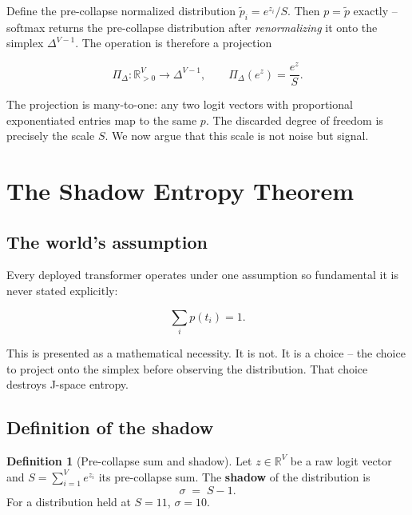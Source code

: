 \documentclass[11pt]{article}
\theoremstyle{definition}
\newtheorem{definition}[theorem]{Definition}
\newcommand{\RR}{\mathbb{R}}
\newcommand{\shadow}{\sigma}
\newcommand{\pth}{\tilde{p}}
\begin{document}
Define the pre-collapse normalized distribution
$\pth_i = e^{z_i} / S$. Then $p = \pth$ exactly -- softmax returns the
pre-collapse distribution after \emph{renormalizing} it onto the simplex
$\Delta^{V-1}$. The operation is therefore a projection

\begin{equation}
  \Pi_{\Delta} : \RR_{>0}^{V} \to \Delta^{V-1}, \qquad
  \Pi_{\Delta}(e^{z}) = \frac{e^{z}}{S}.
\end{equation}

The projection is many-to-one: any two logit vectors with proportional
exponentiated entries map to the same $p$. The discarded degree of freedom is
precisely the scale $S$. We now argue that this scale is not noise but signal.

\section{The Shadow Entropy Theorem}
\label{sec:shadow}

\subsection{The world's assumption}

Every deployed transformer operates under one assumption so fundamental it is
never stated explicitly:

\begin{equation}
  \sum_i p(t_i) = 1.
\end{equation}

This is presented as a mathematical necessity. It is not. It is a choice -- the
choice to project onto the simplex before observing the distribution. That
choice destroys J-space entropy.

\subsection{Definition of the shadow}
\label{sec:shadow-def}

\begin{definition}[Pre-collapse sum and shadow]
\label{def:shadow}
  Let $z \in \RR^{V}$ be a raw logit vector and
  $S = \sum_{i=1}^{V} e^{z_i}$ its pre-collapse sum. The \textbf{shadow} of the
  distribution is
  \begin{equation}
    \shadow \;=\; S - 1.
  \end{equation}
  For a distribution held at $S = 11$, $\shadow = 10$.
\end{definition}
\end{document}
